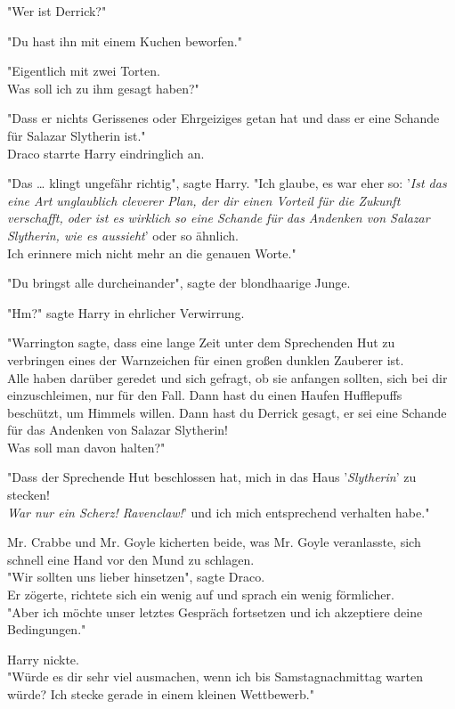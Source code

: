 {"Wer ist Derrick?"

"Du hast ihn mit einem Kuchen beworfen."

"Eigentlich mit zwei Torten.\\ Was soll ich zu ihm gesagt haben?"

"Dass er nichts Gerissenes oder Ehrgeiziges getan hat und dass er eine Schande für Salazar Slytherin ist."\\ Draco starrte Harry eindringlich an.

"Das … klingt ungefähr richtig", sagte Harry. "Ich glaube, es war eher so: '\emph{Ist das eine Art unglaublich cleverer Plan, der dir einen Vorteil für die Zukunft verschafft, oder ist es wirklich so eine Schande für das Andenken von Salazar Slytherin, wie es aussieht}' oder so ähnlich.\\ Ich erinnere mich nicht mehr an die genauen Worte."

"Du bringst alle durcheinander", sagte der blondhaarige Junge.

"Hm?" sagte Harry in ehrlicher Verwirrung.

"Warrington sagte, dass eine lange Zeit unter dem Sprechenden Hut zu verbringen eines der Warnzeichen für einen großen dunklen Zauberer ist.\\ Alle haben darüber geredet und sich gefragt, ob sie anfangen sollten, sich bei dir einzuschleimen, nur für den Fall. Dann hast du einen Haufen Hufflepuffs beschützt, um Himmels willen. Dann hast du Derrick gesagt, er sei eine Schande für das Andenken von Salazar Slytherin!\\ Was soll man davon halten?"

"Dass der Sprechende Hut beschlossen hat, mich in das Haus '\emph{Slytherin}' zu stecken!\\ \emph{War nur ein Scherz! Ravenclaw!}' und ich mich entsprechend verhalten habe."

Mr. Crabbe und Mr. Goyle kicherten beide, was Mr. Goyle veranlasste, sich schnell eine Hand vor den Mund zu schlagen.\\ "Wir sollten uns lieber hinsetzen", sagte Draco.\\ Er zögerte, richtete sich ein wenig auf und sprach ein wenig förmlicher.\\ "Aber ich möchte unser letztes Gespräch fortsetzen und ich akzeptiere deine Bedingungen."

Harry nickte.\\ "Würde es dir sehr viel ausmachen, wenn ich bis Samstagnachmittag warten würde? Ich stecke gerade in einem kleinen Wettbewerb."

}
